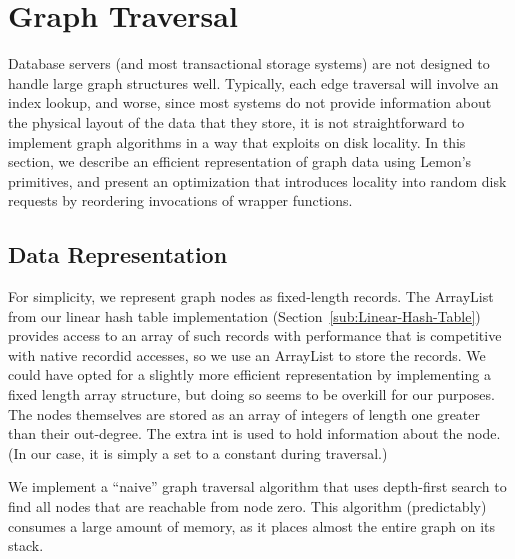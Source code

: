 \documentclass[10pt,letterpaper,twocolumn,english]{article}
\newcommand{\yad}{Lemon\xspace}
\begin{document}
%

\section{Graph Traversal\label{TransClos}}

Database servers (and most transactional storage systems) are not
designed to handle large graph structures well.  Typically, each edge
traversal will involve an index lookup, and worse, since most systems
do not provide information about the physical layout of the data that
they store, it is not straightforward to implement graph algorithms in
a way that exploits on disk locality.  In this section, we describe an
efficient representation of graph data using \yad's primitives, and
present an optimization that introduces locality into random disk
requests by reordering invocations of wrapper functions.

\subsection {Data Representation}

For simplicity, we represent graph nodes as
fixed-length records.  The ArrayList from our linear hash table
implementation (Section~\ref{sub:Linear-Hash-Table}) provides access to an
array of such records with performance that is competitive with native
recordid accesses, so we use an ArrayList to store the records.  We
could have opted for a slightly more efficient representation by
implementing a fixed length array structure, but doing so seems to be
overkill for our purposes.  The nodes themselves are stored as an
array of integers of length one greater than their out-degree. The
extra int is used to hold information about the node.  (In our case,
it is simply a set to a constant during traversal.)

We implement a ``naive'' graph traversal algorithm that uses depth-first search to find all nodes that are reachable from node zero.
This algorithm (predictably) consumes a large amount of memory, as
it places almost the entire graph on its stack.  
\end{document}
